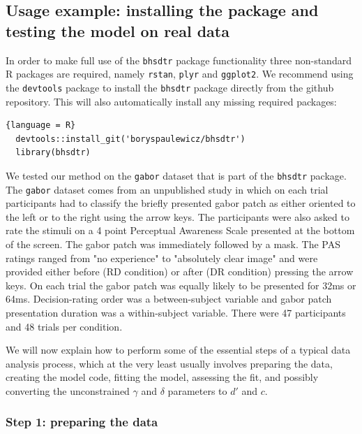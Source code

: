 \documentclass[oneside,a4paper]{article}
\begin{document}
\subsection{Usage example: installing the package and testing the
  model on real data}


In order to make full use of the \texttt{bhsdtr} package functionality
three non-standard R packages are required, namely \texttt{rstan},
\texttt{plyr} and \texttt{ggplot2}. We recommend using the
\texttt{devtools} package to install the \texttt{bhsdtr} package
directly from the github repository. This will also automatically
install any missing required packages:

\begin{lstlisting}{language = R}
  devtools::install_git('boryspaulewicz/bhsdtr')
  library(bhsdtr)
\end{lstlisting}


We tested our method on the \texttt{gabor} dataset that is part of the
\texttt{bhsdtr} package. The \texttt{gabor} dataset comes from an
unpublished study in which on each trial participants had to classify
the briefly presented gabor patch as either oriented to the left or to
the right using the arrow keys. The participants were also asked to
rate the stimuli on a 4 point Perceptual Awareness Scale
\cite{ramsoy2004introspection} presented at the bottom of the
screen. The gabor patch was immediately followed by a mask. The PAS
ratings ranged from "no experience" to "absolutely clear image" and
were provided either before (RD condition) or after (DR condition)
pressing the arrow keys. On each trial the gabor patch was equally
likely to be presented for 32ms or 64ms. Decision-rating order was a
between-subject variable and gabor patch presentation duration was a
within-subject variable. There were 47 participants and 48 trials per
condition.

We will now explain how to perform some of the essential steps of a
typical data analysis process, which at the very least usually
involves preparing the data, creating the model code, fitting the
model, assessing the fit, and possibly converting the unconstrained
$\gamma$ and $\delta$ parameters to $d'$ and $c$.

\subsubsection{Step 1: preparing the data}
\end{document}
